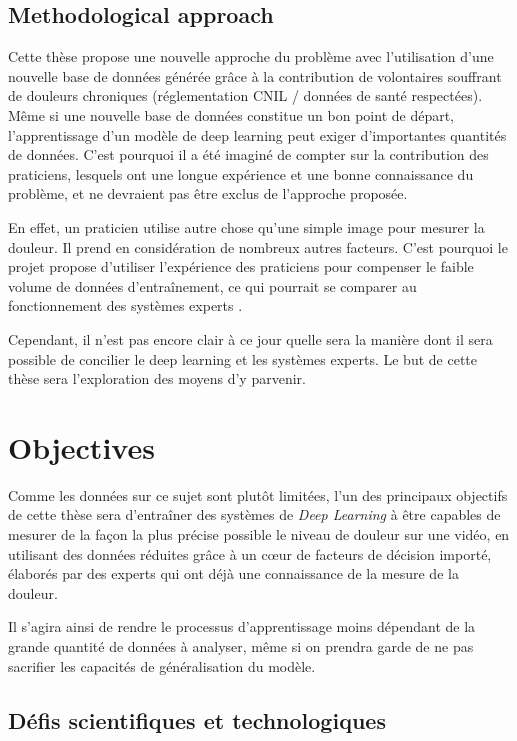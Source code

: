 \documentclass[11pt]{article}
\begin{document}
\subsection{Methodological approach}
\label{sec:org97cce26}

Cette thèse propose une nouvelle approche du problème avec l’utilisation d’une
nouvelle base de données générée grâce à la contribution de volontaires
souffrant de douleurs chroniques (réglementation CNIL / données de santé
respectées). Même si une nouvelle base de données constitue un bon point de
départ, l’apprentissage d’un modèle de deep learning peut exiger d’importantes
quantités de données. C’est pourquoi il a été imaginé de compter sur la
contribution des praticiens, lesquels ont une longue expérience et une bonne
connaissance du problème, et ne devraient pas être exclus de l’approche
proposée. 

En effet, un praticien utilise autre chose qu’une simple image pour mesurer la
douleur. Il prend en considération de nombreux autres facteurs. C’est pourquoi
le projet propose d’utiliser l’expérience des praticiens pour compenser le
faible volume de données d’entraînement, ce qui pourrait se comparer au
fonctionnement des systèmes experts \cite{giarratano1998expert}. 

Cependant, il n’est pas encore clair à ce jour quelle sera la manière dont il
sera possible de concilier le deep learning et les systèmes experts. Le but de
cette thèse sera l’exploration des moyens d’y parvenir. 

\section{Objectives}
\label{sec:orgf1f9281}

Comme les données sur ce sujet sont plutôt limitées, l’un des principaux
objectifs de cette thèse sera d’entraîner des systèmes de \emph{Deep Learning} à être
capables de mesurer de la façon la plus précise possible le niveau de douleur
sur une vidéo, en utilisant des données réduites grâce à un c\oe{}ur de facteurs de
décision importé, élaborés par des experts qui ont déjà une connaissance de la
mesure de la douleur.  

Il s’agira ainsi de rendre le processus d’apprentissage moins dépendant de la
grande quantité de données à analyser, même si on prendra garde de ne pas
sacrifier les capacités de généralisation du modèle.  


\subsection{Défis scientifiques et technologiques}
\label{sec:org70ad40f}
\end{document}
